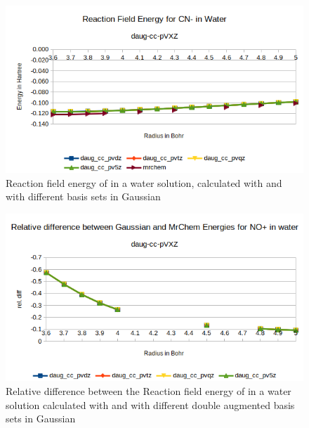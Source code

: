 \documentclass[../master_thesis.tex]{subfiles}
\begin{document}
\begin{figure}[!htb]
  \centering
    \includegraphics[width=\linewidth]{img/Erdaugcyan.png}
  \caption[Energy plots for ]{Reaction field energy of  in a water solution, calculated with \mrchem
  and with different basis sets in Gaussian}
  \label{fig:cyanEnergyplotsdaug}
\end{figure}

\begin{figure}[!htb]
  \centering
    \includegraphics[width=\linewidth]{img/nopdaugreldiff.png}
    \caption[Relative difference between  and double augmented Gaussian results]{Relative difference between the Reaction field energy of  in a water solution calculated with \mrchem
  and with different double augmented basis sets in Gaussian}
  \label{fig:nopreldiffdaug}
\end{figure}
\end{document}
